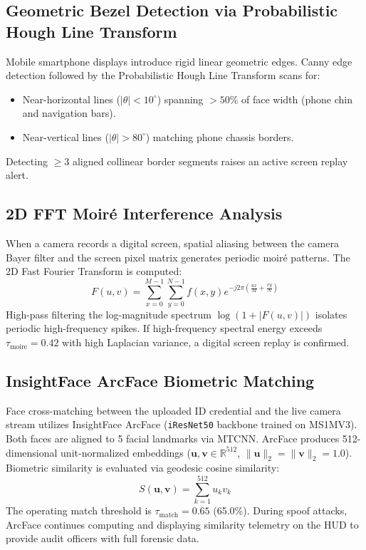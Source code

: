 \documentclass[12pt,a4paper]{report}
\begin{document}
\subsection{Geometric Bezel Detection via Probabilistic Hough Line Transform}
Mobile smartphone displays introduce rigid linear geometric edges. Canny edge detection followed by the Probabilistic Hough Line Transform scans for:
\begin{itemize}
    \item Near-horizontal lines ($|\theta| < 10^\circ$) spanning $>50\%$ of face width (phone chin and navigation bars).
    \item Near-vertical lines ($|\theta| > 80^\circ$) matching phone chassis borders.
\end{itemize}
Detecting $\ge 3$ aligned collinear border segments raises an active screen replay alert.

\subsection{2D FFT Moir\'{e} Interference Analysis}
When a camera records a digital screen, spatial aliasing between the camera Bayer filter and the screen pixel matrix generates periodic moir\'{e} patterns. The 2D Fast Fourier Transform is computed:
\begin{equation}
F(u, v) = \sum_{x=0}^{M-1} \sum_{y=0}^{N-1} f(x, y) e^{-j 2\pi \left( \frac{ux}{M} + \frac{vy}{N} \right)}
\end{equation}
High-pass filtering the log-magnitude spectrum $\log(1 + |F(u, v)|)$ isolates periodic high-frequency spikes. If high-frequency spectral energy exceeds $\tau_{\text{moire}} = 0.42$ with high Laplacian variance, a digital screen replay is confirmed.

\subsection{InsightFace ArcFace Biometric Matching}
Face cross-matching between the uploaded ID credential and the live camera stream utilizes InsightFace ArcFace (\texttt{iResNet50} backbone trained on MS1MV3). Both faces are aligned to 5 facial landmarks via MTCNN. ArcFace produces 512-dimensional unit-normalized embeddings ($\mathbf{u}, \mathbf{v} \in \mathbb{R}^{512}$, $\|\mathbf{u}\|_2 = \|\mathbf{v}\|_2 = 1.0$). Biometric similarity is evaluated via geodesic cosine similarity:
\begin{equation}
S(\mathbf{u}, \mathbf{v}) = \sum_{k=1}^{512} u_k v_k
\end{equation}
The operating match threshold is $\tau_{\text{match}} = 0.65$ (65.0\%). During spoof attacks, ArcFace continues computing and displaying similarity telemetry on the HUD to provide audit officers with full forensic data.
\end{document}
